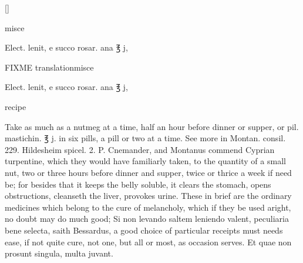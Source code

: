 \begin{Prescription}[H]
[\baselineskip]
\begin{prescriptionbox}{}{\textlatin{misce}}
\item \textlatin{Elect. lenit, e succo rosar. ana ℥ j},
\end{prescriptionbox}
\begin{prescriptionbox}{FIXME translation}{\textlatin{misce}}
\item \textlatin{Elect. lenit, e succo rosar. ana ℥ j},
\end{prescriptionbox}
\caption{ recipe}
\end{Prescription}

Take as much as a nutmeg at a time, half an hour before dinner
or supper, or pil. mastichin. ℥ j. in six pills, a pill or two at a
time. See more in Montan. consil. 229. Hildesheim spicel. 2. P.
Cnemander, and Montanus commend Cyprian turpentine, which they
would have familiarly taken, to the quantity of a small nut, two or
three hours before dinner and supper, twice or thrice a week if need
be; for besides that it keeps the belly soluble, it clears the stomach,
opens obstructions, cleanseth the liver, provokes urine.
These in brief are the ordinary medicines which belong to the cure of
melancholy, which if they be used aright, no doubt may do much good; Si
non levando saltem leniendo valent, peculiaria bene selecta, saith
Bessardus, a good choice of particular receipts must needs ease, if not
quite cure, not one, but all or most, as occasion serves. Et quae non
prosunt singula, multa juvant.
